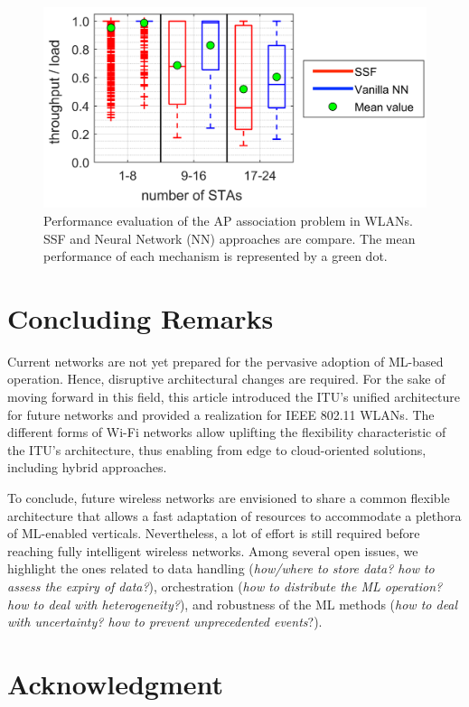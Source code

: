 \documentclass[journal]{IEEEtran}
\begin{document}
\begin{figure}[ht!]
	\centering
	\includegraphics[width=\columnwidth]{output_use_case_ap_association}
	\caption{Performance evaluation of the AP association problem in WLANs. SSF and Neural Network (NN) approaches are compare. The mean performance of each mechanism is represented by a green dot.}
	\label{fig:results_use_case}
\end{figure}

\section{Concluding Remarks}
Current networks are not yet prepared for the pervasive adoption of ML-based operation. Hence, disruptive architectural changes are required. For the sake of moving forward in this field, this article introduced the ITU's unified architecture for future networks and provided a realization for IEEE 802.11 WLANs. The different forms of Wi-Fi networks allow uplifting the flexibility characteristic of the ITU's architecture, thus enabling from edge to cloud-oriented solutions, including hybrid approaches. 

To conclude, future wireless networks are envisioned to share a common flexible architecture that allows a fast adaptation of resources to accommodate a plethora of ML-enabled verticals. Nevertheless, a lot of effort is still required before reaching fully intelligent wireless networks. Among several open issues, we highlight the ones related to data handling (\textit{how/where to store data? how to assess the expiry of data?}), orchestration (\textit{how to distribute the ML operation? how to deal with heterogeneity?}), and robustness of the ML methods (\textit{how to deal with uncertainty? how to prevent unprecedented events}?). 

\section*{Acknowledgment}
\end{document}
